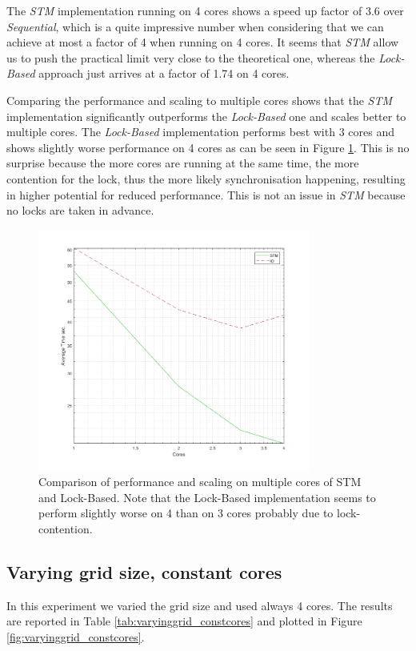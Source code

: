 The \textit{STM} implementation running on 4 cores shows a speed up factor of 3.6 over \textit{Sequential}, which is a quite impressive number when considering that we can achieve at most a factor of 4 when running on 4 cores. It seems that \textit{STM} allow us to push the practical limit very close to the theoretical one, whereas the \textit{Lock-Based} approach just arrives at a factor of 1.74 on 4 cores.

Comparing the performance and scaling to multiple cores shows that the \textit{STM} implementation significantly outperforms the \textit{Lock-Based} one and scales better to multiple cores. The \textit{Lock-Based} implementation performs best with 3 cores and shows slightly worse performance on 4 cores as can be seen in Figure \ref{fig:core_duration_stm_io}. This is no surprise because the more cores are running at the same time, the more contention for the lock, thus the more likely synchronisation happening, resulting in higher potential for reduced performance. This is not an issue in \textit{STM} because no locks are taken in advance. 

\begin{figure}
	\centering
	\includegraphics[width=0.8\textwidth, angle=0]{./fig/concurrentabs/sir/core_duration_stm_io.png}
	\caption{Comparison of performance and scaling on multiple cores of STM and Lock-Based. Note that the Lock-Based implementation seems to perform slightly worse on 4 than on 3 cores probably due to lock-contention.}
	\label{fig:core_duration_stm_io}
\end{figure}

\subsection{Varying grid size, constant cores}
In this experiment we varied the grid size and used always 4 cores. The results are reported in Table \ref{tab:varyinggrid_constcores} and plotted in Figure \ref{fig:varyinggrid_constcores}.


